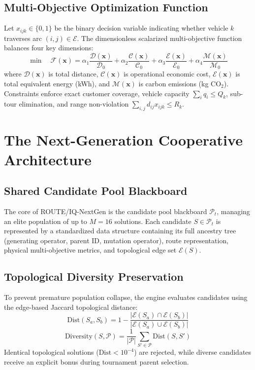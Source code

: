 \documentclass[journal,10pt]{IEEEtran}
\begin{document}
\subsection{Multi-Objective Optimization Function}
Let $x_{ijk} \in \{0, 1\}$ be the binary decision variable indicating whether vehicle $k$ traverses arc $(i, j) \in \mathcal{E}$. The dimensionless scalarized multi-objective function balances four key dimensions:
\begin{equation}
\min \quad \mathcal{F}(\mathbf{x}) = \alpha_1 \frac{\mathcal{D}(\mathbf{x})}{\mathcal{D}_0} + \alpha_2 \frac{\mathcal{C}(\mathbf{x})}{\mathcal{C}_0} + \alpha_3 \frac{\mathcal{E}(\mathbf{x})}{\mathcal{E}_0} + \alpha_4 \frac{\mathcal{M}(\mathbf{x})}{\mathcal{M}_0}
\end{equation}
where $\mathcal{D}(\mathbf{x})$ is total distance, $\mathcal{C}(\mathbf{x})$ is operational economic cost, $\mathcal{E}(\mathbf{x})$ is total equivalent energy (kWh), and $\mathcal{M}(\mathbf{x})$ is carbon emissions (kg CO$_2$). Constraints enforce exact customer coverage, vehicle capacity $\sum_i q_i \le Q_k$, sub-tour elimination, and range non-violation $\sum_{i, j} d_{ij} x_{ijk} \le R_k$.

\section{The Next-Generation Cooperative Architecture}

\subsection{Shared Candidate Pool Blackboard}
The core of ROUTE/IQ-NextGen is the candidate pool blackboard $\mathcal{P}_t$, managing an elite population of up to $M = 16$ solutions. Each candidate $S \in \mathcal{P}_t$ is represented by a standardized data structure containing its full ancestry tree (generating operator, parent ID, mutation operator), route representation, physical multi-objective metrics, and topological edge set $\mathcal{E}(S)$.

\subsection{Topological Diversity Preservation}
To prevent premature population collapse, the engine evaluates candidates using the edge-based Jaccard topological distance:
\begin{equation}
\text{Dist}(S_a, S_b) = 1 - \frac{|\mathcal{E}(S_a) \cap \mathcal{E}(S_b)|}{|\mathcal{E}(S_a) \cup \mathcal{E}(S_b)|}
\end{equation}
\begin{equation}
\text{Diversity}(S, \mathcal{P}) = \frac{1}{|\mathcal{P}|} \sum_{S' \in \mathcal{P}} \text{Dist}(S, S')
\end{equation}
Identical topological solutions ($\text{Dist} < 10^{-4}$) are rejected, while diverse candidates receive an explicit bonus during tournament parent selection.
\end{document}
